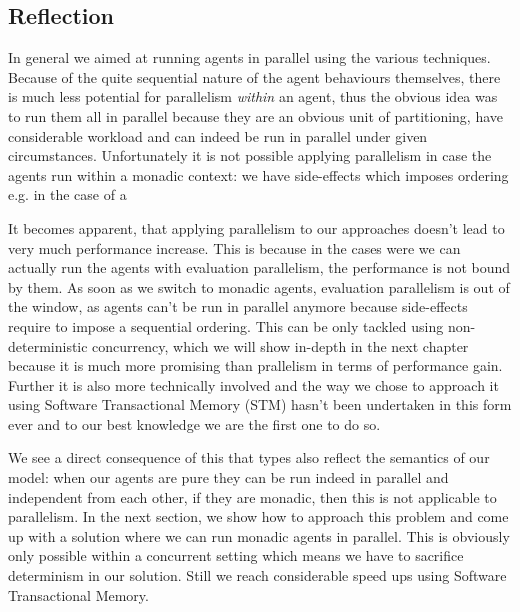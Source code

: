 \subsection{Reflection}
In general we aimed at running agents in parallel using the various techniques. Because of the quite sequential nature of the agent behaviours themselves, there is much less potential for parallelism \textit{within} an agent, thus the obvious idea was to run them all in parallel because they are an obvious unit of partitioning, have considerable workload and can indeed be run in parallel under given circumstances.
Unfortunately it is not possible applying parallelism in case the agents run within a monadic context: we have side-effects which imposes ordering e.g. in the case of a

It becomes apparent, that applying parallelism to our approaches doesn't lead to very much performance increase. This is because in the cases were we can actually run the agents with evaluation parallelism, the performance is not bound by them. As soon as we switch to monadic agents, evaluation parallelism is out of the window, as agents can't be run in parallel anymore because side-effects require to impose a sequential ordering. This can be only tackled using non-deterministic concurrency, which we will show in-depth in the next chapter because it is much more promising than prallelism in terms of performance gain. Further it is also more technically involved and the way we chose to approach it using Software Transactional Memory (STM) hasn't been undertaken in this form ever and to our best knowledge we are the first one to do so.

We see a direct consequence of this that types also reflect the semantics of our model: when our agents are pure they can be run indeed in parallel and independent from each other, if they are monadic, then this is not applicable to parallelism. In the next section, we show how to approach this problem and come up with a solution where we can run monadic agents in parallel. This is obviously only possible within a concurrent setting which means we have to sacrifice determinism in our solution. Still we reach considerable speed ups using Software Transactional Memory.